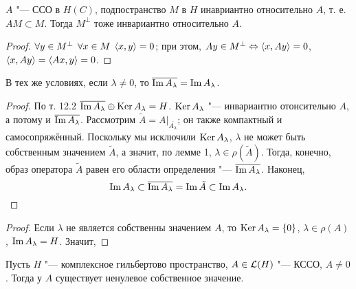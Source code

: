 \documentclass[main]{subfiles}
\begin{document}
\begin{lemma}%
  \( A \) "--- ССО в \( H(C) \),
  подпостранство \( M \) в \( H \)
  инавриантно относительно \( A \),
  т. е. \( AM \subset M \).
  Тогда \( M^\perp \) тоже инвариантно
  относительно \( A \).
\end{lemma}
\begin{proof}
  \( \forall {y \in M^\perp} \; \, \forall {x \in M} \; \,
  \langle x, y \rangle = 0 \); при этом,
  \( Ay \in M^\perp \Leftrightarrow \langle x, Ay \rangle = 0 \),
  \( \langle x, Ay \rangle = \langle Ax, y \rangle = 0 \).
\end{proof}

\begin{lemma}%
  В тех же условиях, если \( \lambda \ne 0 \),
  то \( \overline{\operatorname{Im} A_\lambda} = \operatorname{Im} A_\lambda \).
\end{lemma}
\begin{proof}
  По т. 12.2 \( \overline{\operatorname{Im} A_\lambda} \oplus \operatorname{Ker} A_\lambda = H \).
  \( \operatorname{Ker} A_\lambda \) "--- инвариантно отонсительно \( A \),
  а потому и \( \overline{\operatorname{Im} A_\lambda} \).
  Рассмотрим \( \tilde A = A \bigr|_{\overline{A_\lambda}} \);
  он также компактный и самосопряжённый.
  Поскольку мы исключили \( \operatorname{Ker} A_\lambda \),
  \( \lambda \) не может быть собственным значением \( \tilde A \),
  а значит, по лемме 1, \( \lambda \in \rho(\tilde A) \).
  Тогда, конечно, образ оператора \( \tilde A \) равен
  его области определения "--- \( \overline{\operatorname{Im} A_\lambda} \).
  Наконец,
  \[
    \operatorname{Im} A_\lambda \subset
    \overline{\operatorname{Im} A_\lambda} =
    \operatorname{Im} \tilde A \subset
    \operatorname{Im} A_\lambda. \qedhere
  \]
\end{proof}

\begin{theorem}[Фредгольма]
  
\end{theorem}
\begin{proof}
  Если \( \lambda \) не является собственны значением \( A \),
  то \( \operatorname{Ker} A_\lambda = \{ 0 \} \),
  \( \lambda \in \rho(A) \), \( \operatorname{Im} A_\lambda = H \).
  Значит,
\end{proof}

\begin{lemma}
  Пусть \( H \) "--- комплексное гильбертово пространство,
  \( A \in \Linears{H} \) "--- КССО, \( A \ne 0 \).
  Тогда у \( A \) существует ненулевое собственное значение.
\end{lemma}
\end{document}
